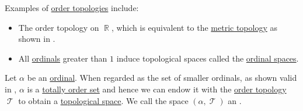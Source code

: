 \begin{example}\label{ex:def:order_topology}
  Examples of \hyperref[def:order_topology]{order topologies} include:
  \begin{itemize}
    \item The order topology on \( \BbbR \), which is equivalent to the \hyperref[def:metric_topology]{metric topology} as shown in .

    \item All \hyperref[def:ordinal]{ordinals} greater than \( 1 \) induce topological spaces called the \hyperref[def:ordinal_space]{ordinal spaces}.
  \end{itemize}
\end{example}

\begin{definition}\label{def:ordinal_space}
  Let \( \alpha \) be an \hyperref[def:ordinal]{ordinal}. When regarded as the set of smaller ordinals, as shown valid in , \( \alpha \) is a \hyperref[def:totally_ordered_set]{totally order set} and hence we can endow it with the \hyperref[def:order_topology]{order topology} \( \mscrT \) to obtain a \hyperref[def:topological_space]{topological space}. We call the space \( (\alpha, \mscrT) \) an .
\end{definition}

